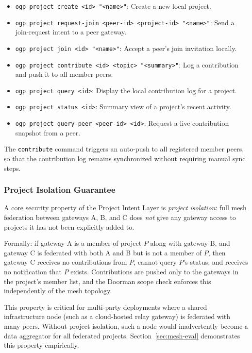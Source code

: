\documentclass[conference]{IEEEtran}
\begin{document}
\begin{itemize}
  \item \texttt{ogp project create <id> "<name>"}: Create a new local project.
  \item \texttt{ogp project request-join <peer-id> <project-id> "<name>"}: Send a join-request intent to a peer gateway.
  \item \texttt{ogp project join <id> "<name>"}: Accept a peer's join invitation locally.
  \item \texttt{ogp project contribute <id> <topic> "<summary>"}: Log a contribution and push it to all member peers.
  \item \texttt{ogp project query <id>}: Display the local contribution log for a project.
  \item \texttt{ogp project status <id>}: Summary view of a project's recent activity.
  \item \texttt{ogp project query-peer <peer-id> <id>}: Request a live contribution snapshot from a peer.
\end{itemize}

The \texttt{contribute} command triggers an auto-push to all registered member peers, so that the contribution log remains synchronized without requiring manual sync steps.

\subsubsection{Project Isolation Guarantee}

A core security property of the Project Intent Layer is \emph{project isolation}: full mesh federation between gateways A, B, and C does \emph{not} give any gateway access to projects it has not been explicitly added to.

Formally: if gateway A is a member of project $P$ along with gateway B, and gateway C is federated with both A and B but is not a member of $P$, then gateway C receives no contributions from $P$, cannot query $P$'s status, and receives no notification that $P$ exists. Contributions are pushed only to the gateways in the project's member list, and the Doorman scope check enforces this independently of the mesh topology.

This property is critical for multi-party deployments where a shared infrastructure node (such as a cloud-hosted relay gateway) is federated with many peers. Without project isolation, such a node would inadvertently become a data aggregator for all federated projects. Section~\ref{sec:mesh-eval} demonstrates this property empirically.
\end{document}
